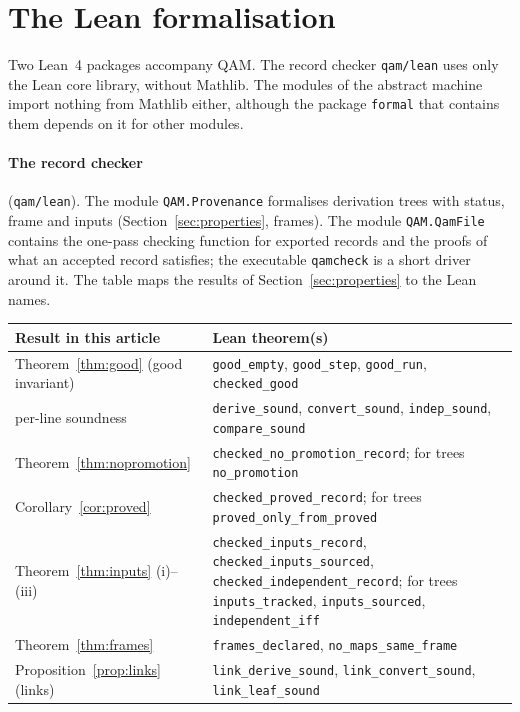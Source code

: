 \section{The Lean formalisation}\label{app:lean}

Two Lean~4 packages accompany QAM. The record checker \texttt{qam/lean} uses only the Lean core library, without Mathlib. The modules of the abstract machine import nothing from Mathlib either, although the package \texttt{formal} that contains them depends on it for other modules.

\paragraph{The record checker} (\texttt{qam/lean}). The module \texttt{QAM.Provenance} formalises derivation trees with status, frame
and inputs (Section~\ref{sec:properties}, frames). The module \texttt{QAM.QamFile} contains the one-pass checking function for
exported records and the proofs of what an accepted record satisfies; the executable \texttt{qamcheck} is a short driver around it. The table maps the results of Section~\ref{sec:properties} to the
Lean names.
\begin{center}
\small
\begin{tabular}{@{}p{}p{}@{}}
\toprule
Result in this article & Lean theorem(s)\\
\midrule
Theorem~\ref{thm:good} (good invariant) & \texttt{good\_empty}, \texttt{good\_step}, \texttt{good\_run}, \texttt{checked\_good}\\
per-line soundness & \texttt{derive\_sound}, \texttt{convert\_sound}, \texttt{indep\_sound}, \texttt{compare\_sound}\\
Theorem~\ref{thm:nopromotion} & \texttt{checked\_no\_promotion\_record}; for trees \texttt{no\_promotion}\\
Corollary~\ref{cor:proved} & \texttt{checked\_proved\_record}; for trees \texttt{proved\_only\_from\_proved}\\
Theorem~\ref{thm:inputs} (i)--(iii) & \texttt{checked\_inputs\_record}, \texttt{checked\_inputs\_sourced}, \texttt{checked\_independent\_record};
for trees \texttt{inputs\_tracked}, \texttt{inputs\_sourced}, \texttt{independent\_iff}\\
Theorem~\ref{thm:frames} & \texttt{frames\_declared}, \texttt{no\_maps\_same\_frame}\\
Proposition~\ref{prop:links} (links) & \texttt{link\_derive\_sound}, \texttt{link\_convert\_sound}, \texttt{link\_leaf\_sound}\\
\bottomrule
\end{tabular}
\end{center}
